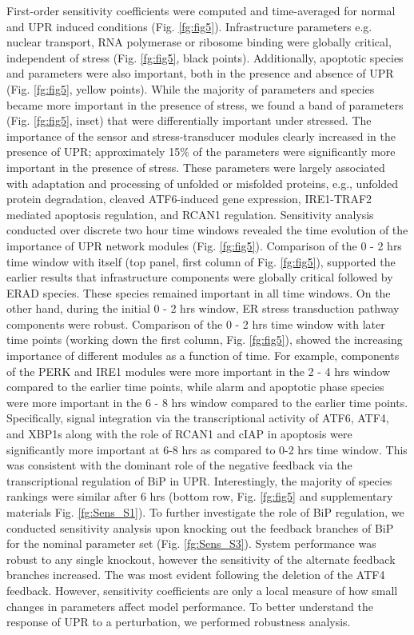 \documentclass[fleqn,10pt]{wlscirep}
\begin{document}
First-order sensitivity coefficients were computed and time-averaged for normal and UPR induced conditions (Fig. \ref{fg:fig5}).
Infrastructure parameters e.g. nuclear transport, RNA polymerase or ribosome binding were globally critical, independent of stress (Fig. \ref{fg:fig5}, black points).
Additionally, apoptotic species and parameters were also important, both in the presence and absence of UPR (Fig. \ref{fg:fig5}, yellow points).
While the majority of parameters and species became more important in the presence of stress, we found a band of parameters (Fig. \ref{fg:fig5}, inset) that were differentially important under stressed.
The importance of the sensor and stress-transducer modules clearly increased in the presence of UPR; approximately 15\% of the parameters were significantly more important in the presence of stress.
These parameters were largely associated with adaptation and processing of unfolded or misfolded proteins, e.g., unfolded protein degradation, cleaved ATF6-induced gene expression, IRE1-TRAF2 mediated apoptosis regulation, and RCAN1 regulation.
Sensitivity analysis conducted over discrete two hour time windows revealed the time evolution of the importance of UPR network modules (Fig. \ref{fg:fig5}).
Comparison of the 0 - 2 hrs time window with itself (top panel, first column of Fig. \ref{fg:fig5}), supported the earlier results that infrastructure components were globally critical followed by ERAD species.
These species remained important in all time windows. On the other hand, during the initial 0 - 2 hrs window, ER stress transduction pathway components were robust.
Comparison of the 0 - 2 hrs time window with later time points (working down the first column, Fig. \ref{fg:fig5}), showed the increasing importance of different modules as a function of time.
For example, components of the PERK and IRE1 modules were more important in the 2 - 4 hrs window compared to the earlier time points, while alarm and apoptotic phase species were more important in the 6 - 8 hrs window compared to the earlier time points.
Specifically, signal integration via the transcriptional activity of ATF6, ATF4, and XBP1s along with the role of RCAN1 and cIAP in apoptosis were significantly more important at 6-8 hrs as compared to 0-2 hrs time window.
This was consistent with the dominant role of the negative feedback via the transcriptional regulation of BiP in UPR.
Interestingly, the majority of species rankings were similar after 6 hrs (bottom row,  Fig. \ref{fg:fig5} and supplementary materials Fig. \ref{fg:Sens_S1}).
To further investigate the role of BiP regulation, we conducted sensitivity analysis upon knocking out the feedback branches of BiP for the nominal parameter set (Fig. \ref{fg:Sens_S3}).
System performance was robust to any single knockout, however the sensitivity of the alternate feedback branches increased.
The was most evident following the deletion of the ATF4 feedback.
However, sensitivity coefficients are only a local measure of how small changes in parameters affect model performance.
To better understand the response of UPR to a perturbation, we performed robustness analysis.
\end{document}
